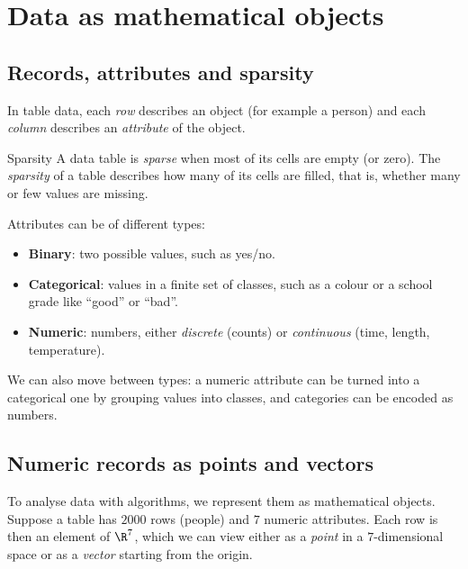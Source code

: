 \documentclass[a4paper,12pt,oneside]{report}
\begin{document}
\section{Data as mathematical objects}

\subsection{Records, attributes and sparsity}

In table data, each \emph{row} describes an object (for example a
person) and each \emph{column} describes an \emph{attribute} of the
object.

\begin{frameddefn}{Sparsity}\label{def:sparsity}
A data table is \emph{sparse} when most of its cells are empty (or
zero). The \emph{sparsity} of a table describes how many of its cells
are filled, that is, whether many or few values are missing.
\end{frameddefn}

Attributes can be of different types:
\begin{itemize}
  \item \textbf{Binary}: two possible values, such as yes/no.
  \item \textbf{Categorical}: values in a finite set of classes, such
    as a colour or a school grade like ``good'' or ``bad''.
  \item \textbf{Numeric}: numbers, either \emph{discrete} (counts) or
    \emph{continuous} (time, length, temperature).
\end{itemize}
We can also move between types: a numeric attribute can be turned into
a categorical one by grouping values into classes, and categories can
be encoded as numbers.

\subsection{Numeric records as points and vectors}

To analyse data with algorithms, we represent them as mathematical
objects. Suppose a table has $2000$ rows (people) and $7$ numeric
attributes. Each row is then an element of $\R^7$, which we can view
either as a \emph{point} in a $7$-dimensional space or as a
\emph{vector} starting from the origin.

\begin{center}
\end{center}
\end{document}
